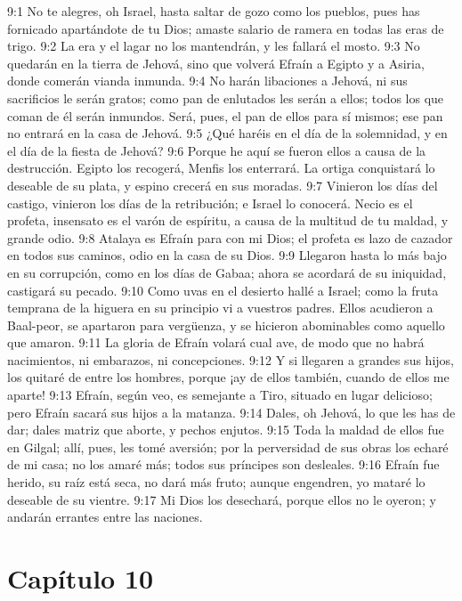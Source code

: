 								9:1 No te alegres, oh Israel, hasta saltar de gozo como los pueblos, pues has fornicado apartándote de tu Dios; amaste salario de ramera en todas las eras de trigo. 
								9:2 La era y el lagar no los mantendrán, y les fallará el mosto. 
								9:3 No quedarán en la tierra de Jehová, sino que volverá Efraín a Egipto y a Asiria, donde comerán vianda inmunda. 
								9:4 No harán libaciones a Jehová, ni sus sacrificios le serán gratos; como pan de enlutados les serán a ellos; todos los que coman de él serán inmundos. Será, pues, el pan de ellos para sí mismos; ese pan no entrará en la casa de Jehová. 
								9:5 ¿Qué haréis en el día de la solemnidad, y en el día de la fiesta de Jehová? 
								9:6 Porque he aquí se fueron ellos a causa de la destrucción. Egipto los recogerá, Menfis los enterrará. La ortiga conquistará lo deseable de su plata, y espino crecerá en sus moradas. 
								9:7 Vinieron los días del castigo, vinieron los días de la retribución; e Israel lo conocerá. Necio es el profeta, insensato es el varón de espíritu, a causa de la multitud de tu maldad, y grande odio. 
								9:8 Atalaya es Efraín para con mi Dios; el profeta es lazo de cazador en todos sus caminos, odio en la casa de su Dios. 
								9:9 Llegaron hasta lo más bajo en su corrupción, como en los días de Gabaa; ahora se acordará de su iniquidad, castigará su pecado. 
								9:10 Como uvas en el desierto hallé a Israel; como la fruta temprana de la higuera en su principio vi a vuestros padres. Ellos acudieron a Baal-peor, se apartaron para vergüenza, y se hicieron abominables como aquello que amaron. 
								9:11 La gloria de Efraín volará cual ave, de modo que no habrá nacimientos, ni embarazos, ni concepciones. 
								9:12 Y si llegaren a grandes sus hijos, los quitaré de entre los hombres, porque ¡ay de ellos también, cuando de ellos me aparte! 
								9:13 Efraín, según veo, es semejante a Tiro, situado en lugar delicioso; pero Efraín sacará sus hijos a la matanza. 
								9:14 Dales, oh Jehová, lo que les has de dar; dales matriz que aborte, y pechos enjutos. 
								9:15 Toda la maldad de ellos fue en Gilgal; allí, pues, les tomé aversión; por la perversidad de sus obras los echaré de mi casa; no los amaré más; todos sus príncipes son desleales. 
								9:16 Efraín fue herido, su raíz está seca, no dará más fruto; aunque engendren, yo mataré lo deseable de su vientre. 
								9:17 Mi Dios los desechará, porque ellos no le oyeron; y andarán errantes entre las naciones. 
								\section*{Capítulo 10 }
									
